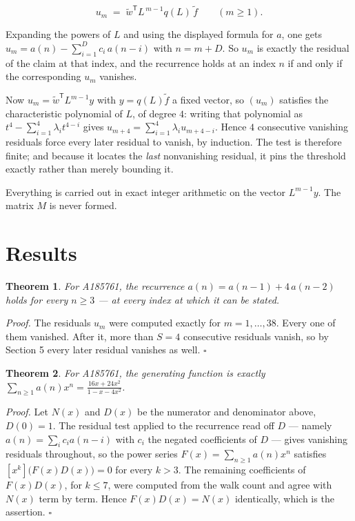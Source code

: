 \documentclass[11pt]{article}
\newtheorem{theorem}{Theorem}
\theoremstyle{definition}
\begin{document}
\[u_m \;=\; \tilde w^{\mathsf T} L^{\,m-1} q(L)\,\tilde f \qquad (m \ge 1).\]

Expanding the powers of $L$ and using the displayed formula for $a$, one gets $u_m = a(n) - \sum_{i=1}^{D} c_i\,a(n-i)$ with $n = m + D$. So $u_m$ is exactly the residual of the claim at that index, and the recurrence holds at an index $n$ if and only if the corresponding $u_m$ vanishes.

Now $u_m = \tilde w^{\mathsf T} L^{m-1} y$ with $y = q(L)\tilde f$ a fixed vector, so $(u_m)$ satisfies the characteristic polynomial of $L$, of degree $4$: writing that polynomial as $t^{4} - \sum_{i=1}^{4} \lambda_i t^{4-i}$ gives $u_{m+4} = \sum_{i=1}^{4} \lambda_i u_{m+4-i}$. Hence $4$ consecutive vanishing residuals force every later residual to vanish, by induction. The test is therefore finite; and because it locates the {\itshape last} nonvanishing residual, it pins the threshold exactly rather than merely bounding it.

Everything is carried out in exact integer arithmetic on the vector $L^{m-1}y$. The matrix $M$ is never formed.

\section{Results}

\begin{theorem} For A185761, the recurrence $a(n) = a(n-1) + 4\,a(n-2)$ holds for every $n \ge 3$ --- at every index at which it can be stated.\end{theorem}

{\itshape Proof.} The residuals $u_m$ were computed exactly for $m = 1,\dots,38$. Every one of them vanished. After it, more than $S = 4$ consecutive residuals vanish, so by Section 5 every later residual vanishes as well. $\square$

\begin{theorem} For A185761, the generating function is exactly $\sum_{n\ge 1} a(n)x^n = \frac{16x + 24x^{2}}{1 - x - 4x^{2}}$.\end{theorem}

{\itshape Proof.} Let $N(x)$ and $D(x)$ be the numerator and denominator above, $D(0)=1$. The residual test applied to the recurrence read off $D$ --- namely $a(n) = \sum_i c_i a(n-i)$ with $c_i$ the negated coefficients of $D$ --- gives vanishing residuals throughout, so the power series $F(x)=\sum_{n\ge 1}a(n)x^n$ satisfies $[x^k]\bigl(F(x)D(x)\bigr) = 0$ for every $k > 3$. The remaining coefficients of $F(x)D(x)$, for $k \le 7$, were computed from the walk count and agree with $N(x)$ term by term. Hence $F(x)D(x) = N(x)$ identically, which is the assertion. $\square$
\end{document}
